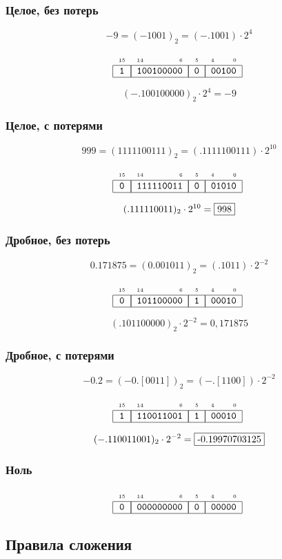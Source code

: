 \begin{frame}
    \frametitle{Целое, без потерь}
    \[
        -9=(-1001)_2=(-.1001)\cdot 2^{4}
    \]
    
    \[
        \FloatMyHex{1}{100100000}{0}{00100}
    \]
    
    \[
        (-.100100000)_2\cdot 2^{4}=-9
    \]
\end{frame}


\begin{frame}
    \frametitle{Целое, с потерями}
    \[
        999=(1111100111)_2=(.1111100111)\cdot 2^{10}
    \]
    
    \[
        \FloatMyHex{0}{111110011}{0}{01010}
    \]
    
    \[
        (.111110011)_2\cdot 2^{10}=\fbox{998}
    \]
\end{frame}


\begin{frame}
    \frametitle{Дробное, без потерь}
    \[
        0.171875=(0.001011)_2=(.1011)\cdot 2^{-2}
    \]
    
    \[
        \FloatMyHex{0}{101100000}{1}{00010}
    \]
    
    \[
        (.101100000)_2\cdot 2^{-2}=0,171875
    \]
\end{frame}

\begin{frame}
    \frametitle{Дробное, с потерями}
    \[
        -0.2=(-0.[0011])_2=(-.[1100])\cdot 2^{-2}
    \]
    
    \[
        \FloatMyHex{1}{110011001}{1}{00010}
    \]
    
    \[
        (-.110011001)_2\cdot 2^{-2}=\fbox{-0.19970703125}
    \]
\end{frame}

\begin{frame}
    \frametitle{Ноль}
    
    \[
        \FloatMyHex{0}{000000000}{0}{00000}
    \]
\end{frame}


\subsection{Правила сложения}


